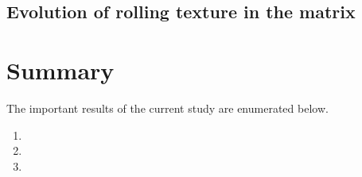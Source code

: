 \lipsum[2-4]









\subsection{Evolution of rolling texture in the matrix}

\lipsum[2-4]



\section{Summary}

\lipsum[2-4]

The important results of the current study are enumerated below.

\begin{enumerate}
\item  \lipsum[1]

\item  \lipsum[1]

\item \lipsum[1]
\end{enumerate}